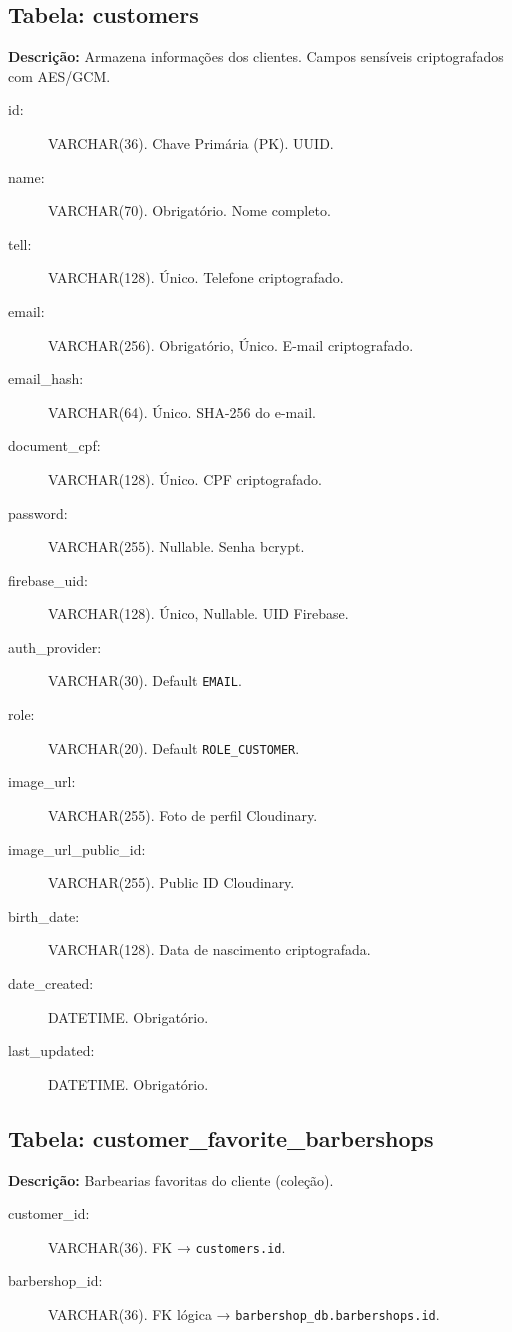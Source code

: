 \documentclass[
    12pt, 
    a4paper, 
    oneside, 
    chapter=TITLE, 
    section=TITLE
]{abntex2}
\begin{document}
\begin{apendicesenv}
\subsection*{Tabela: customers}
\textbf{Descrição:} Armazena informações dos clientes. Campos sensíveis criptografados com AES/GCM.
\begin{description}
    \item[id:] VARCHAR(36). Chave Primária (PK). UUID.
    \item[name:] VARCHAR(70). Obrigatório. Nome completo.
    \item[tell:] VARCHAR(128). Único. Telefone criptografado.
    \item[email:] VARCHAR(256). Obrigatório, Único. E-mail criptografado.
    \item[email\_hash:] VARCHAR(64). Único. SHA-256 do e-mail.
    \item[document\_cpf:] VARCHAR(128). Único. CPF criptografado.
    \item[password:] VARCHAR(255). Nullable. Senha bcrypt.
    \item[firebase\_uid:] VARCHAR(128). Único, Nullable. UID Firebase.
    \item[auth\_provider:] VARCHAR(30). Default \texttt{EMAIL}.
    \item[role:] VARCHAR(20). Default \texttt{ROLE\_CUSTOMER}.
    \item[image\_url:] VARCHAR(255). Foto de perfil Cloudinary.
    \item[image\_url\_public\_id:] VARCHAR(255). Public ID Cloudinary.
    \item[birth\_date:] VARCHAR(128). Data de nascimento criptografada.
    \item[date\_created:] DATETIME. Obrigatório.
    \item[last\_updated:] DATETIME. Obrigatório.
\end{description}

\subsection*{Tabela: customer\_favorite\_barbershops}
\textbf{Descrição:} Barbearias favoritas do cliente (coleção).
\begin{description}
    \item[customer\_id:] VARCHAR(36). FK → \texttt{customers.id}.
    \item[barbershop\_id:] VARCHAR(36). FK lógica → \texttt{barbershop\_db.barbershops.id}.
\end{description}


\end{apendicesenv}
\end{document}
